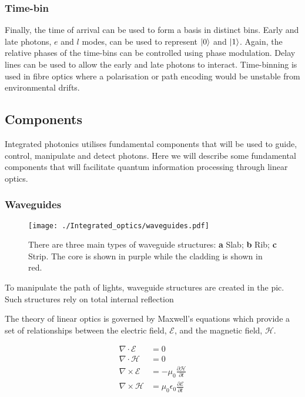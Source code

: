 \subsubsection*{Time-bin}

Finally, the time of arrival can be used to form a basis in distinct bins. Early and late photons, $e$ and $l$ modes, can be used to represent $\ket{0}$ and $\ket{1}$. Again, the relative phases of the time-bins can be controlled using phase modulation. Delay lines can be used to allow the early and late photons to interact. Time-binning is used in fibre optics where a polarisation or path encoding would be unstable from environmental drifts.

\subsection{Components}

Integrated photonics utilises fundamental components that will be used to guide, control, manipulate and detect photons. Here we will describe some fundamental components that will facilitate quantum information processing through linear optics.

\subsubsection*{Waveguides}

\begin{figure}[t]
	\centering
	\texttt{[image: ./Integrated\_optics/waveguides.pdf]}
	\caption[Main types of waveguide structures]{There are three main types of waveguide structures:  \textbf{a} Slab; \textbf{b} Rib; \textbf{c} Strip. The core is shown in purple while the cladding is shown in red.}
	\label{fig:waveguides}
\end{figure}

To manipulate the path of lights, waveguide structures are created in the \ac{pic}. Such structures rely on total internal reflection 

The theory of linear optics is governed by Maxwell's equations which provide a set of relationships between the electric field, $\mathcal{E}$, and the magnetic field, $\mathcal{H}$.

\begin{align}
	\nabla\cdot\mathcal{E} &= 0\\
	\nabla\cdot\mathcal{H} &= 0\\
	\nabla\times\mathcal{E} &= -\mu_0\frac{\partial\mathcal{H}}{\partial t}\\
	\nabla\times\mathcal{H} &= \mu_0\epsilon_0\frac{\partial\mathcal{E}}{\partial t}
\end{align}

